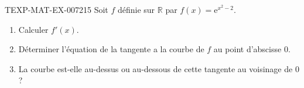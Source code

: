 \begin{exercice}{TEXP-MAT-EX-007}{2}{15}
Soit $f$ définie sur $\mathbb{R}$ par $f(x) = \mathrm{e}^{x^2 - 2}$.
\begin{enumerate}
  \item Calculer $f'(x)$.
  \item Déterminer l'équation de la tangente a la courbe de $f$ au point d'abscisse $0$.
  \item La courbe est-elle au-dessus ou au-dessous de cette tangente au voisinage de $0$ ?
\end{enumerate}

\end{exercice}
